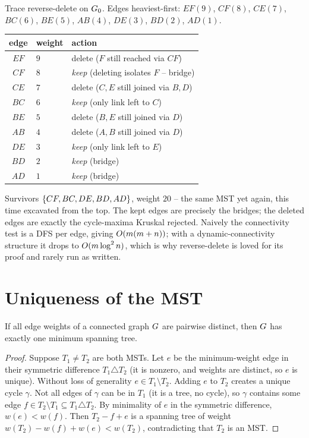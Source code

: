 \begin{labbox}
Trace reverse-delete on $G_0$. Edges heaviest-first:
$EF(9)$, $CF(8)$, $CE(7)$, $BC(6)$, $BE(5)$, $AB(4)$, $DE(3)$, $BD(2)$, $AD(1)$.

\begin{center}
\begin{tabular}{cll}
\toprule
edge & weight & action \\
\midrule
$EF$ & $9$ & delete ($F$ still reached via $CF$) \\
$CF$ & $8$ & \emph{keep} (deleting isolates $F$ -- bridge) \\
$CE$ & $7$ & delete ($C,E$ still joined via $B,D$) \\
$BC$ & $6$ & \emph{keep} (only link left to $C$) \\
$BE$ & $5$ & delete ($B,E$ still joined via $D$) \\
$AB$ & $4$ & delete ($A,B$ still joined via $D$) \\
$DE$ & $3$ & \emph{keep} (only link left to $E$) \\
$BD$ & $2$ & \emph{keep} (bridge) \\
$AD$ & $1$ & \emph{keep} (bridge) \\
\bottomrule
\end{tabular}
\end{center}

Survivors $\{CF,BC,DE,BD,AD\}$, weight $20$ -- the same MST yet again, this time excavated from the top. The kept edges are precisely the bridges; the deleted edges are exactly the cycle-maxima Kruskal rejected. Naively the connectivity test is a DFS per edge, giving $O(m(m+n))$; with a dynamic-connectivity structure it drops to $O(m\log^2 n)$, which is why reverse-delete is loved for its proof and rarely run as written.
\end{labbox}

\section{Uniqueness of the MST}
\label{ch06:uniqueness}

\begin{theorem}
\label{ch06:unique}
If all edge weights of a connected graph $G$ are pairwise distinct, then $G$ has exactly one minimum spanning tree.
\end{theorem}

\begin{proof}
Suppose $T_1\ne T_2$ are both MSTs. Let $e$ be the minimum-weight edge in their symmetric difference $T_1\triangle T_2$ (it is nonzero, and weights are distinct, so $e$ is unique). Without loss of generality $e\in T_1\setminus T_2$. Adding $e$ to $T_2$ creates a unique cycle $\gamma$. Not all edges of $\gamma$ can be in $T_1$ (it is a tree, no cycle), so $\gamma$ contains some edge $f\in T_2\setminus T_1\subseteq T_1\triangle T_2$. By minimality of $e$ in the symmetric difference, $w(e)<w(f)$. Then $T_2-f+e$ is a spanning tree of weight $w(T_2)-w(f)+w(e)<w(T_2)$, contradicting that $T_2$ is an MST.
\end{proof}

